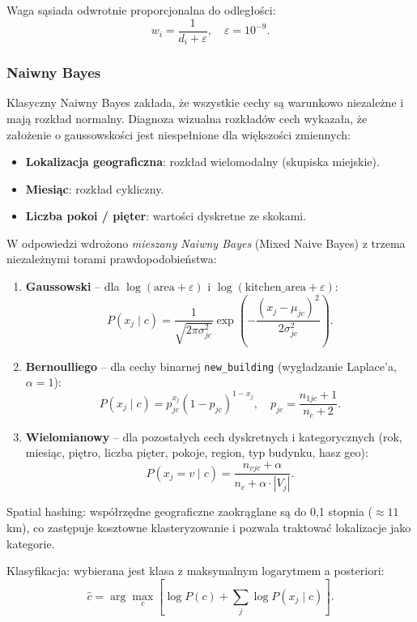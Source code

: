 \documentclass[12pt,a4paper]{article}
\begin{document}
	Waga sąsiada odwrotnie proporcjonalna do odległości:
	\[
	w_i = \frac{1}{d_i + \varepsilon}, \quad \varepsilon = 10^{-9}.
	\]
	
	\newpage
	\subsubsection{Naiwny Bayes}
	
	Klasyczny Naiwny Bayes zakłada, że wszystkie cechy są warunkowo niezależne
	i mają rozkład normalny. Diagnoza wizualna rozkładów cech wykazała, że założenie
	o gaussowskości jest niespełnione dla większości zmiennych:
	
	\begin{itemize}
		\item \textbf{Lokalizacja geograficzna}: rozkład wielomodalny (skupiska miejskie).
		\item \textbf{Miesiąc}: rozkład cykliczny.
		\item \textbf{Liczba pokoi / pięter}: wartości dyskretne ze skokami.
	\end{itemize}
	
	W odpowiedzi wdrożono \emph{mieszany Naiwny Bayes} (Mixed Naive Bayes)
	z trzema niezależnymi torami prawdopodobieństwa:
	
	\begin{enumerate}
		\item \textbf{Gaussowski} -- dla $\log(\text{area}+\varepsilon)$ i $\log(\text{kitchen\_area}+\varepsilon)$:
		\[
		P(x_j \mid c) = \frac{1}{\sqrt{2\pi\sigma_{jc}^2}}
		\exp\!\left(-\frac{(x_j - \mu_{jc})^2}{2\sigma_{jc}^2}\right).
		\]
		\item \textbf{Bernoulliego} -- dla cechy binarnej \texttt{new\_building}
		(wygładzanie Laplace'a, $\alpha = 1$):
		\[
		P(x_j \mid c) = p_{jc}^{x_j}(1-p_{jc})^{1-x_j}, \quad
		p_{jc} = \frac{n_{1jc} + 1}{n_c + 2}.
		\]
		\item \textbf{Wielomianowy} -- dla pozostałych cech dyskretnych i kategorycznych
		(rok, miesiąc, piętro, liczba pięter, pokoje, region, typ budynku, hasz geo):
		\[
		P(x_j = v \mid c) = \frac{n_{vjc} + \alpha}{n_c + \alpha \cdot |V_j|}.
		\]
	\end{enumerate}
	
	Spatial hashing: współrzędne geograficzne zaokrąglane są do 0{,}1 stopnia
	($\approx 11$ km), co zastępuje kosztowne klasteryzowanie i pozwala traktować
	lokalizacje jako kategorie.
	
	Klasyfikacja: wybierana jest klasa z maksymalnym logarytmem a posteriori:
	\[
	\hat{c} = \arg\max_c \left[
	\log P(c) + \sum_j \log P(x_j \mid c)
	\right].
	\]
	
\end{document}
